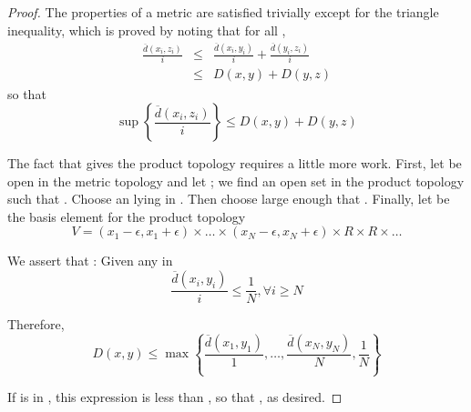 \begin{proof}
      The properties of a metric are satisfied trivially except for the triangle inequality, which is proved by noting that for all ,
      \begin{eqnarray*}
            \frac{\overline{d}(x_{i},z_{i})}{i} &\le& \frac{\overline{d}(x_{i},y_{i})}{i} + \frac{\overline{d}(y_{i},z_{i})}{i} \\
            &\le& D(x,y) + D(y,z)
      \end{eqnarray*}
      so that
      \begin{equation*}
            \sup\left\{
                  \frac{\overline{d}(x_{i},z_{i})}{i}
            \right\} \le D(x,y) + D(y,z)
      \end{equation*}

      The fact that  gives the product topology requires a little more work. First, let  be open in the metric topology and let ; we find an open set  in the product topology such that . Choose an   lying in . Then choose  large enough that . Finally, let  be the basis element for the product topology
      \begin{equation*}
            V = (x_{1}-\epsilon,x_{1}+\epsilon) \times \dots \times (x_{N}-\epsilon,x_{N}+\epsilon) \times R \times R \times \dots
      \end{equation*}

      We assert that : Given any  in 
      \begin{equation*}
            \frac{\overline{d}(x_{i},y_{i})}{i} \le \frac{1}{N}, \forall i \ge N
      \end{equation*}

      Therefore,
      \begin{equation*}
            D(x,y) \le \max\left\{
                  \frac{\overline{d}(x_{1},y_{1})}{1},\dots,\frac{\overline{d}(x_{N},y_{N})}{N},\frac{1}{N}
            \right\}
      \end{equation*}

      If  is in , this expression is less than \mt{
            \epsilon
      }, so that , as desired.


\end{proof}
